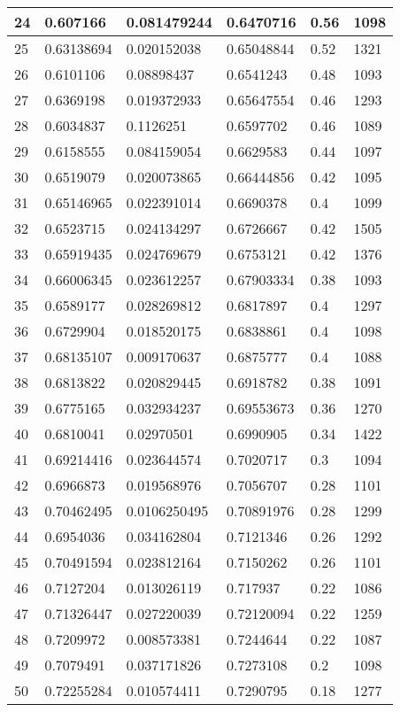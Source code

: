 \begin{longtable}{|l|l|l|l|l|l|}
24 & 0.607166 & 0.081479244 & 0.6470716 & 0.56 & 1098 \\ \hline 
25 & 0.63138694 & 0.020152038 & 0.65048844 & 0.52 & 1321 \\ \hline 
26 & 0.6101106 & 0.08898437 & 0.6541243 & 0.48 & 1093 \\ \hline 
27 & 0.6369198 & 0.019372933 & 0.65647554 & 0.46 & 1293 \\ \hline 
28 & 0.6034837 & 0.1126251 & 0.6597702 & 0.46 & 1089 \\ \hline 
29 & 0.6158555 & 0.084159054 & 0.6629583 & 0.44 & 1097 \\ \hline 
30 & 0.6519079 & 0.020073865 & 0.66444856 & 0.42 & 1095 \\ \hline 
31 & 0.65146965 & 0.022391014 & 0.6690378 & 0.4 & 1099 \\ \hline 
32 & 0.6523715 & 0.024134297 & 0.6726667 & 0.42 & 1505 \\ \hline 
33 & 0.65919435 & 0.024769679 & 0.6753121 & 0.42 & 1376 \\ \hline 
34 & 0.66006345 & 0.023612257 & 0.67903334 & 0.38 & 1093 \\ \hline 
35 & 0.6589177 & 0.028269812 & 0.6817897 & 0.4 & 1297 \\ \hline 
36 & 0.6729904 & 0.018520175 & 0.6838861 & 0.4 & 1098 \\ \hline 
37 & 0.68135107 & 0.009170637 & 0.6875777 & 0.4 & 1088 \\ \hline 
38 & 0.6813822 & 0.020829445 & 0.6918782 & 0.38 & 1091 \\ \hline 
39 & 0.6775165 & 0.032934237 & 0.69553673 & 0.36 & 1270 \\ \hline 
40 & 0.6810041 & 0.02970501 & 0.6990905 & 0.34 & 1422 \\ \hline 
41 & 0.69214416 & 0.023644574 & 0.7020717 & 0.3 & 1094 \\ \hline 
42 & 0.6966873 & 0.019568976 & 0.7056707 & 0.28 & 1101 \\ \hline 
43 & 0.70462495 & 0.0106250495 & 0.70891976 & 0.28 & 1299 \\ \hline 
44 & 0.6954036 & 0.034162804 & 0.7121346 & 0.26 & 1292 \\ \hline 
45 & 0.70491594 & 0.023812164 & 0.7150262 & 0.26 & 1101 \\ \hline 
46 & 0.7127204 & 0.013026119 & 0.717937 & 0.22 & 1086 \\ \hline 
47 & 0.71326447 & 0.027220039 & 0.72120094 & 0.22 & 1259 \\ \hline 
48 & 0.7209972 & 0.008573381 & 0.7244644 & 0.22 & 1087 \\ \hline 
49 & 0.7079491 & 0.037171826 & 0.7273108 & 0.2 & 1098 \\ \hline 
50 & 0.72255284 & 0.010574411 & 0.7290795 & 0.18 & 1277 \\ \hline 
\end{longtable}